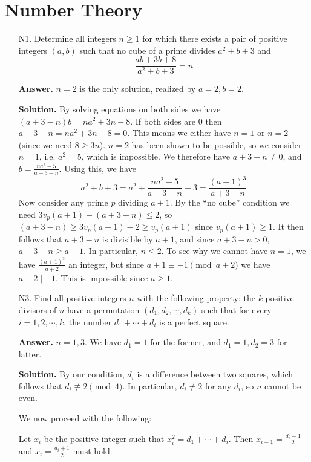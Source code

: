 \documentclass[11pt,a4paper]{article}
\begin{document}
	\section*{Number Theory}
	\begin{enumerate}
		\item [N1.] 
		Determine all integers $n\ge 1$ for which there exists a pair of positive integers $(a, b)$ such that 
		no cube of a prime divides $a^2+b+3$ and 
		\[
		\frac{ab+3b+8}{a^2+b+3} = n
		\]
		
		\textbf{Answer.} $n=2$ is the only solution, realized by $a=2, b=2$. 
		
		\textbf{Solution.} By solving equations on both sides we have $(a + 3 - n)b = na^2+3n - 8$. 
		If both sides are 0 then $a+3-n=na^2+3n-8=0$. 
		This means we either have $n=1$ or $n=2$ (since we need $8\ge 3n$). 
		$n=2$ has been shown to be possible, so we consider $n=1$, 
		i.e. $a^2=5$, which is impossible. 
		We therefore have $a+3-n\neq 0$, and $b=\frac{na^2-5}{a+3-n}$. 
		Using this, we have 
		\[
		a^2+b+3 = a^2 + \frac{na^2-5}{a+3-n} + 3 = \frac{(a+1)^3}{a + 3 - n}
		\]
		Now consider any prime $p$ dividing $a+1$. 
		By the ``no cube'' condition we need $3v_p(a+1) - (a+3-n)\le 2$, 
		so $(a+3-n)\ge 3v_p(a+1)-2\ge v_p(a+1)$ since $v_p(a+1)\ge 1$. 
		It then follows that $a+3-n$ is divisible by $a+1$, and since $a+3-n>0$, 
		$a+3-n\ge a+1$. In particular, $n\le 2$. 
		To see why we cannot have $n=1$, we have $\frac{(a+1)^3}{a+2}$ an integer, 
		but since $a+1\equiv -1\pmod{a+2}$ we have $a+2\mid -1$. 
		This is impossible since $a\ge 1$. 
		
		\item [N3.] 
		Find all positive integers $n$ with the following property: the $k$ positive divisors of $n$ have a permutation $(d_1,d_2, \cdots ,d_k)$ such that for every $i = 1,2,\cdots ,k$, 
		the number $d_1 + \cdots + d_i$ is a perfect square.
		
		\textbf{Answer.} $n=1, 3$. We have $d_1=1$ for the former, and $d_1=1, d_2=3$ for latter. 
		
		\textbf{Solution.} 
		By our condition, $d_i$ is a difference between two squares, 
		which follows that $d_i\not \equiv 2\pmod{4}$. 
		In particular, $d_i\neq 2$ for any $d_i$, so $n$ cannot be even.
		
		We now proceed with the following: 
		
		\begin{lemma}\label{lemma:n3}
			Let $x_i$ be the positive integer such that $x_i^2 = d_1 + \cdots + d_i$. 
			Then $x_{i-1}=\frac{d_i-1}{2}$ and $x_i=\frac{d_i + 1}{2}$ must hold. 
		\end{lemma}
		

\end{enumerate}
\end{document}
